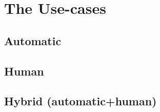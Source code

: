 
\chapter{The Use-cases}
\label{cap:cases}





\section{Automatic}
\label{sec:cases:automatic}


\section{Human}
\label{sec:cases:human}



\section{Hybrid (automatic+human)}
\label{sec:cases:hybrid}

